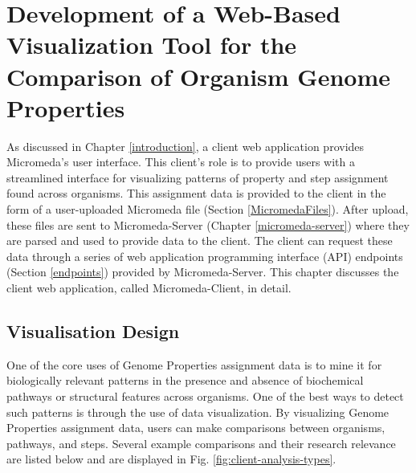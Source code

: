 \chapter{Development of a Web-Based Visualization Tool for the Comparison of Organism Genome Properties} \label{micromeda-client}

As discussed in Chapter \ref{introduction}, a client web application provides Micromeda's user interface. This client's role is to provide users with a streamlined interface for visualizing patterns of property and step assignment found across organisms. This assignment data is provided to the client in the form of a user-uploaded Micromeda file (Section \ref{MicromedaFiles}). After upload, these files are sent to Micromeda-Server (Chapter \ref{micromeda-server}) where they are parsed and used to provide data to the client. The client can request these data through a series of web application programming interface (API) endpoints (Section \ref{endpoints}) provided by Micromeda-Server. This chapter discusses the client web application, called Micromeda-Client, in detail.

\section{Visualisation Design} \label{visualization-design}

One of the core uses of Genome Properties assignment data is to mine it for biologically relevant patterns in the presence and absence of biochemical pathways or structural features across organisms. One of the best ways to detect such patterns is through the use of data visualization. By visualizing Genome Properties assignment data, users can make comparisons between organisms, pathways, and steps. Several example comparisons and their research relevance are listed below and are displayed in Fig. \ref{fig:client-analysis-types}. 

